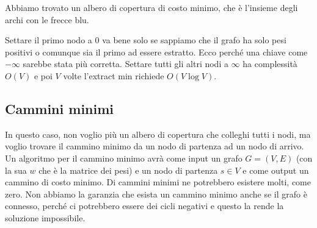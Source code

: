 \documentclass[a4paper]{article}
\begin{document}
{\begin{figure}[H]
\end{figure}
\noindent
Abbiamo trovato un albero di copertura di costo minimo, che è l'insieme degli archi con le frecce blu.
}
\noindent
Settare il primo nodo a $0$ va bene solo se sappiamo che il grafo ha solo pesi positivi o comunque sia il primo ad essere
estratto. Ecco perché una chiave come $-\infty$ sarebbe stata più corretta. 
Settare tutti gli altri nodi a $\infty$ ha complessità $O(V)$ e poi $V$ volte l'extract min richiede $O(V \log V)$.


\subsection{Cammini minimi}

In questo caso, non voglio più un albero di copertura che colleghi tutti i nodi, ma voglio trovare il cammino minimo da un nodo di partenza ad un nodo di arrivo.
Un algoritmo per il cammino minimo avrà come input un grafo $G = (V, E)$ (con la sua $w$ che è la matrice dei pesi) e un nodo di partenza $s \in V$ e come output un cammino di costo minimo.
Di cammini minimi ne potrebbero esistere molti, come zero.
Non abbiamo la garanzia che esista un cammino minimo anche se il grafo è connesso, perché ci potrebbero essere dei cicli negativi e questo la rende la soluzione impossibile.
\end{document}
